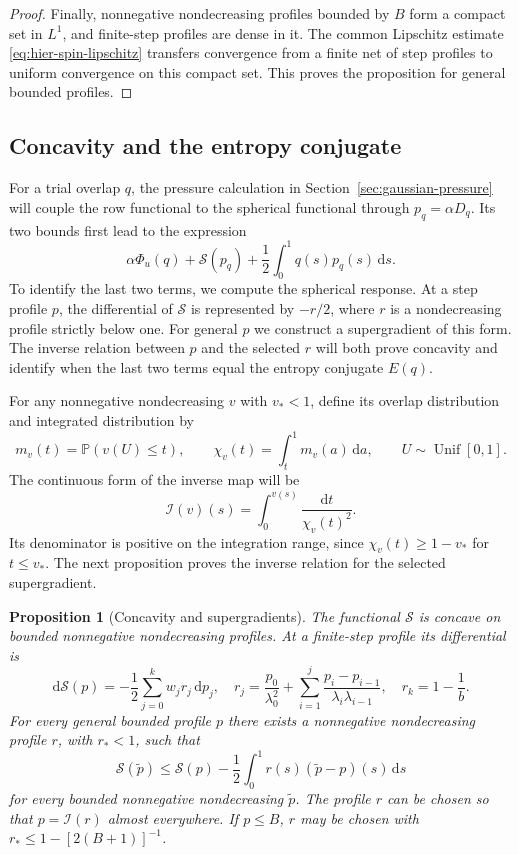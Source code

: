 \documentclass[11pt,a4paper]{article}
\numberwithin{equation}{section}
\newtheorem{proposition}[theorem]{Proposition}
\theoremstyle{definition}
\theoremstyle{remark}
\newcommand{\Prob}{\mathbb P}
\newcommand{\dd}{\mathrm d}
\begin{document}
\begin{proof}
Finally, nonnegative nondecreasing profiles bounded by $B$ form a compact
set in $L^1$, and finite-step profiles are dense in it.  The common
Lipschitz estimate \eqref{eq:hier-spin-lipschitz} transfers convergence from
a finite net of step profiles to uniform convergence on this compact set.
This proves the proposition for general bounded profiles.
\end{proof}

\subsection{Concavity and the entropy conjugate}

For a trial overlap $q$, the pressure calculation in
Section~\ref{sec:gaussian-pressure} will couple the row functional to
the spherical functional through $p_q=\alpha D_q$.  Its two bounds first
lead to the expression
\[
 \alpha\Phi_u(q)+\mathcal S(p_q)+\frac12\int_0^1q(s)p_q(s)\,\dd s.
\]
To identify the last two terms, we compute the spherical response.
At a step profile $p$, the differential of $\mathcal S$ is represented
by $-r/2$, where $r$ is a nondecreasing profile strictly below one.
For general $p$ we construct a supergradient of this form.  The inverse
relation between $p$ and the selected $r$ will both prove concavity and
identify when the last two terms equal the entropy conjugate $E(q)$.

For any nonnegative nondecreasing $v$ with $v_*<1$, define its overlap
distribution and integrated distribution by
\[
 m_v(t)=\Prob(v(U)\le t),\qquad
 \chi_v(t)=\int_t^1m_v(a)\,\dd a,
 \qquad U\sim\operatorname{Unif}[0,1].
\]
The continuous form of the inverse map will be
\begin{equation}\label{eq:press-continuous-inverse}
 \mathcal I(v)(s)=\int_0^{v(s)}\frac{\dd t}{\chi_v(t)^2}.
\end{equation}
Its denominator is positive on the integration range, since
$\chi_v(t)\ge1-v_*$ for $t\le v_*$.  The next proposition proves the
inverse relation for the selected supergradient.

\begin{proposition}[Concavity and supergradients]
\label{prop:hier-spin-concavity}
The functional $\mathcal S$ is concave on bounded nonnegative nondecreasing
profiles.  At a finite-step profile its differential is
\begin{equation}
 \dd\mathcal S(p)=-\frac12\sum_{j=0}^k w_jr_j\,\dd p_j,
 \quad
 r_j=\frac{p_0}{\lambda_0^2}
       +\sum_{i=1}^j\frac{p_i-p_{i-1}}{\lambda_i\lambda_{i-1}},
 \quad r_k=1-\frac1b.
 \label{eq:hier-spin-gradient}
\end{equation}
For every general bounded profile $p$ there exists a nonnegative
nondecreasing profile $r$, with $r_*<1$, such that
\begin{equation}
 \mathcal S(\widetilde p)
 \le\mathcal S(p)-\frac12\int_0^1r(s)(\widetilde p-p)(s)\,\dd s
 \label{eq:hier-spin-tangent}
\end{equation}
for every bounded nonnegative nondecreasing $\widetilde p$.
The profile $r$ can be chosen so that $p=\mathcal I(r)$ almost everywhere.
If $p\le B$, $r$ may be chosen with
$r_*\le1-[2(B+1)]^{-1}$.
\end{proposition}
\end{document}
